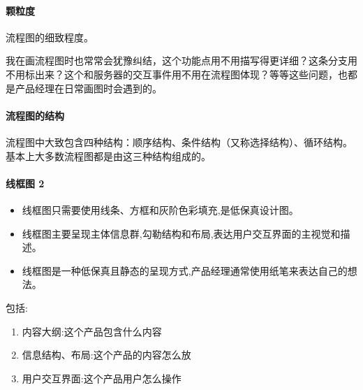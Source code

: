 \documentclass[letterpaper,10pt,english]{sphinxmanual}
\begin{document}
\paragraph{颗粒度}
\label{\detokenize{chapter_knowledge/flow_chart:id14}}
流程图的细致程度。

我在画流程图时也常常会犹豫纠结，这个功能点用不用描写得更详细？这条分支用不用标出来？这个和服务器的交互事件用不用在流程图体现？等等这些问题，也都是产品经理在日常画图时会遇到的。


\paragraph{流程图的结构}
\label{\detokenize{chapter_knowledge/flow_chart:id15}}
流程图中大致包含四种结构：顺序结构、条件结构（又称选择结构）、循环结构。基本上大多数流程图都是由这三种结构组成的。


\paragraph{线框图 2\sphinxfootnotemark[587]}
\label{\detokenize{chapter_knowledge/flow_chart:id16}}%
\begin{footnotetext}[587]\sphinxAtStartFootnote
{}
%
\end{footnotetext}\ignorespaces \begin{itemize}
\item {} 
线框图只需要使用线条、方框和灰阶色彩填充,是低保真设计图。

\item {} 
线框图主要呈现主体信息群,勾勒结构和布局,表达用户交互界面的主视觉和描述。

\item {} 
线框图是一种低保真且静态的呈现方式,产品经理通常使用纸笔来表达自己的想法。

\end{itemize}

包括:
\begin{enumerate}
%
\item {} 
内容大纲:这个产品包含什么内容

\item {} 
信息结构、布局:这个产品的内容怎么放

\item {} 
用户交互界面:这个产品用户怎么操作

\end{enumerate}
\end{document}
